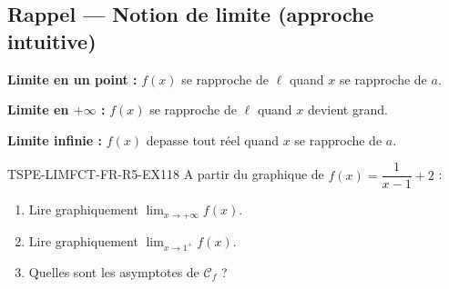 

\subsection*{Rappel — Notion de limite (approche intuitive)}

\textbf{Limite en un point :} $f(x)$ se rapproche de $\ell$ quand $x$ se rapproche de $a$.

\textbf{Limite en $+\infty$ :} $f(x)$ se rapproche de $\ell$ quand $x$ devient grand.

\textbf{Limite infinie :} $f(x)$ depasse tout réel quand $x$ se rapproche de $a$.

\begin{exercice}{TSPE-LIMFCT-FR-R5-EX1}{1}{8}
A partir du graphique de $f(x) = \dfrac{1}{x-1} + 2$ :
\begin{enumerate}
  \item Lire graphiquement $\lim_{x \to +\infty} f(x)$.
  \item Lire graphiquement $\lim_{x \to 1^+} f(x)$.
  \item Quelles sont les asymptotes de $\mathcal{C}_f$ ?
\end{enumerate}
\end{exercice}

